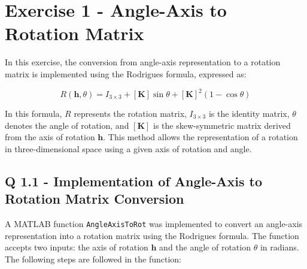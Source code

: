 \section{Exercise 1 - Angle-Axis to Rotation Matrix} \label{P1}
In this exercise, the conversion from angle-axis representation to a rotation matrix is implemented using the Rodrigues formula, expressed as:

\begin{equation} \label{rodrigues_formula}
R(\mathbf{h}, \theta) = I_{3 \times 3} + [\mathbf{K}] \sin \theta + [\mathbf{K}]^2 (1 - \cos \theta)
\end{equation}

In this formula, \( R \) represents the rotation matrix, \( I_{3 \times 3} \) is the identity matrix, \( \theta \) denotes the angle of rotation, and \( [\mathbf{K}] \) is the skew-symmetric matrix derived from the axis of rotation \( \mathbf{h} \). This method allows the representation of a rotation in three-dimensional space using a given axis of rotation and angle.

\subsection{Q 1.1 - Implementation of Angle-Axis to Rotation Matrix Conversion}

A MATLAB function \texttt{AngleAxisToRot} was implemented to convert an angle-axis representation into a rotation matrix using the Rodrigues formula. The function accepts two inputs: the axis of rotation \( \mathbf{h} \) and the angle of rotation \( \theta \) in radians. The following steps are followed in the function:

